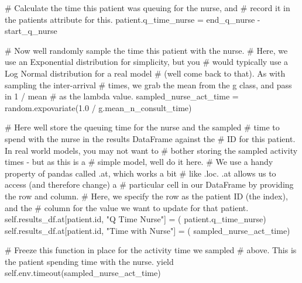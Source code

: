 \documentclass[
  letterpaper,
  DIV=11,
  numbers=noendperiod]{scrreprt}
\newenvironment{Shaded}{\begin{snugshade}}{\end{snugshade}}
\newcommand{\BuiltInTok}[1]{\textcolor[rgb]{0.00,0.23,0.31}{#1}}
\newcommand{\CommentTok}[1]{\textcolor[rgb]{0.37,0.37,0.37}{#1}}
\newcommand{\ControlFlowTok}[1]{\textcolor[rgb]{0.00,0.23,0.31}{#1}}
\newcommand{\FloatTok}[1]{\textcolor[rgb]{0.68,0.00,0.00}{#1}}
\newcommand{\NormalTok}[1]{\textcolor[rgb]{0.00,0.23,0.31}{#1}}
\newcommand{\OperatorTok}[1]{\textcolor[rgb]{0.37,0.37,0.37}{#1}}
\newcommand{\StringTok}[1]{\textcolor[rgb]{0.13,0.47,0.30}{#1}}
\newcommand{\VariableTok}[1]{\textcolor[rgb]{0.07,0.07,0.07}{#1}}
\begin{document}
\begin{tcolorbox}
\begin{Shaded}
\begin{Highlighting}[]
            \CommentTok{\# Calculate the time this patient was queuing for the nurse, and}
            \CommentTok{\# record it in the patient\textquotesingle{}s attribute for this.}
\NormalTok{            patient.q\_time\_nurse }\OperatorTok{=}\NormalTok{ end\_q\_nurse }\OperatorTok{{-}}\NormalTok{ start\_q\_nurse}

            \CommentTok{\# Now we\textquotesingle{}ll randomly sample the time this patient with the nurse.}
            \CommentTok{\# Here, we use an Exponential distribution for simplicity, but you}
            \CommentTok{\# would typically use a Log Normal distribution for a real model}
            \CommentTok{\# (we\textquotesingle{}ll come back to that).  As with sampling the inter{-}arrival}
            \CommentTok{\# times, we grab the mean from the g class, and pass in 1 / mean}
            \CommentTok{\# as the lambda value.}
\NormalTok{            sampled\_nurse\_act\_time }\OperatorTok{=}\NormalTok{ random.expovariate(}\FloatTok{1.0} \OperatorTok{/}
\NormalTok{                                                        g.mean\_n\_consult\_time)}

            \CommentTok{\# Here we\textquotesingle{}ll store the queuing time for the nurse and the sampled}
            \CommentTok{\# time to spend with the nurse in the results DataFrame against the}
            \CommentTok{\# ID for this patient.  In real world models, you may not want to}
            \CommentTok{\# bother storing the sampled activity times {-} but as this is a}
            \CommentTok{\# simple model, we\textquotesingle{}ll do it here.}
            \CommentTok{\# We use a handy property of pandas called .at, which works a bit}
            \CommentTok{\# like .loc.  .at allows us to access (and therefore change) a}
            \CommentTok{\# particular cell in our DataFrame by providing the row and column.}
            \CommentTok{\# Here, we specify the row as the patient ID (the index), and the}
            \CommentTok{\# column for the value we want to update for that patient.}
            \VariableTok{self}\NormalTok{.results\_df.at[patient.}\BuiltInTok{id}\NormalTok{, }\StringTok{"Q Time Nurse"}\NormalTok{] }\OperatorTok{=}\NormalTok{ (}
\NormalTok{                patient.q\_time\_nurse)}
            \VariableTok{self}\NormalTok{.results\_df.at[patient.}\BuiltInTok{id}\NormalTok{, }\StringTok{"Time with Nurse"}\NormalTok{] }\OperatorTok{=}\NormalTok{ (}
\NormalTok{                sampled\_nurse\_act\_time)}

            \CommentTok{\# Freeze this function in place for the activity time we sampled}
            \CommentTok{\# above.  This is the patient spending time with the nurse.}
            \ControlFlowTok{yield} \VariableTok{self}\NormalTok{.env.timeout(sampled\_nurse\_act\_time)}


\end{Highlighting}
\end{Shaded}
\end{tcolorbox}
\end{document}
